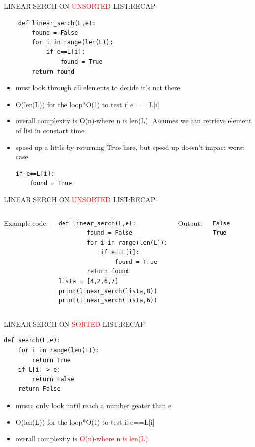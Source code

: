 \documentclass[aspectratio=169]{beamer}
\begin{document}
\begin{frame}[fragile]{LINEAR SERCH ON \textcolor{red}{UNSORTED} LIST:RECAP}
\begin{lstlisting}
	def linear_serch(L,e):
		found = False
		for i in range(len(L)):
			if e==L[i]:
				found = True
		return found    
\end{lstlisting}
 
\begin{itemize}
\item must look through all elements to decide it’s not there
\item O(len(L)) for the loop*O(1) to test if e == L[i]
\item overall complexity is O(n)-where n is len(L). Assumes we can retrieve element of list in constant time
\item speed up a little by returning True here, but speed up doesn't impact worst case
\begin{lstlisting}
if e==L[i]:
	found = True
\end{lstlisting} 
\end{itemize}
\end{frame}

\begin{frame}[fragile]{LINEAR SERCH ON \textcolor{red}{UNSORTED} LIST:RECAP}
\begin{columns}
Example code:
\begin{lstlisting}
def linear_serch(L,e):
		found = False
		for i in range(len(L)):
			if e==L[i]:
				found = True
		return found
lista = [4,2,6,7]
print(linear_serch(lista,8))
print(linear_serch(lista,6))
\end{lstlisting}
Output:
\begin{block}{}
\begin{verbatim}
False
True
\end{verbatim}
\end{block}
\end{columns}
\end{frame}


\begin{frame}[fragile]{LINEAR SERCH ON \textcolor{red}{SORTED} LIST:RECAP}
\begin{lstlisting}
def search(L,e):
	for i in range(len(L)):
		return True
	if L[i] > e:
		return False
	return False
\end{lstlisting}
\begin{itemize}
\item musto only look until reach a number geater than e
\item O(len(L)) for the loop*O(1) to test if e==L[i]
\item overall complexity is \textcolor{red}{O(n)-where n is len(L)}
\end{itemize}
\end{frame}
\end{document}
